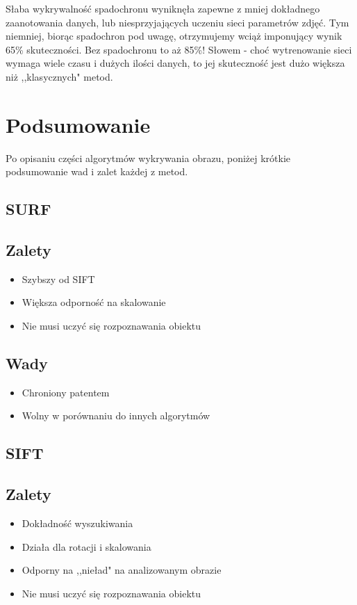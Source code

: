 \documentclass[polish,a4paper]{article}
\begin{document}
Słaba wykrywalność spadochronu wyniknęła zapewne z mniej dokładnego zaanotowania danych, lub niesprzyjających uczeniu sieci parametrów zdjęć. Tym niemniej, biorąc spadochron pod uwagę, otrzymujemy wciąż imponujący wynik 65\% skuteczności. Bez spadochronu to aż 85\%! Słowem - choć wytrenowanie sieci wymaga wiele czasu i dużych ilości danych, to jej skuteczność jest dużo większa niż ,,klasycznych" metod.

\section{Podsumowanie}
Po opisaniu części algorytmów wykrywania obrazu, poniżej krótkie podsumowanie wad i zalet każdej z metod.

\subsection{SURF}
\subsection{Zalety}
\begin{itemize}
  \item Szybszy od SIFT
  \item Większa odporność na skalowanie
  \item Nie musi uczyć się rozpoznawania obiektu
\end{itemize}
\subsection{Wady}
\begin{itemize}
  \item Chroniony patentem
  \item Wolny w porównaniu do innych algorytmów
\end{itemize}

\subsection{SIFT}
\subsection{Zalety}
\begin{itemize}
  \item Dokładność wyszukiwania
  \item Działa dla rotacji i skalowania
  \item Odporny na ,,nieład" na analizowanym obrazie
  \item Nie musi uczyć się rozpoznawania obiektu
\end{itemize}
\end{document}
